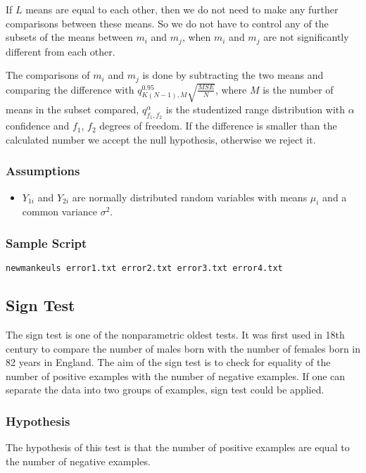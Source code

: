 \documentclass[a4paper,12pt]{book}
\begin{document}
If $L$ means are equal to each other, then we do not need to make any further comparisons between these means. 
So we do not have to control any of the subsets of the means between $m_i$ and $m_j$, when $m_i$ and $m_j$ are not significantly different from each other.

The comparisons of $m_i$ and $m_j$ is done by subtracting the two means and comparing the difference with
$q_{K(N-1),M}^{0.95}\sqrt{\frac{MSE}{N}}$, where $M$ is the number of means in the subset compared, $q_{f_1,f_2}^{\alpha}$ is the studentized 
range distribution with $\alpha$ confidence and $f_1$, $f_2$ degrees of freedom. If the difference
is smaller than the calculated number we accept the null hypothesis, otherwise we reject it.

\subsubsection{Assumptions}
\begin{itemize}
\item $Y_{1i}$ and $Y_{2i}$ are normally distributed random variables with means $\mu_i$ and a common variance $\sigma^2$.
\end{itemize}

\subsubsection{Sample Script}
\begin{verbatim}
newmankeuls error1.txt error2.txt error3.txt error4.txt
\end{verbatim}

\subsection{Sign Test}
The sign test is one of the nonparametric oldest tests. It was first used in 18th century to compare the number of males born with the number of females born in 82 years in England. The aim of the sign test is to check for equality of the number of positive examples with the number of negative examples. If one can separate the data into two groups of examples, sign test could be applied.

\subsubsection{Hypothesis}
The hypothesis of this test is that the number of positive examples are equal to the number of negative examples.
\end{document}
